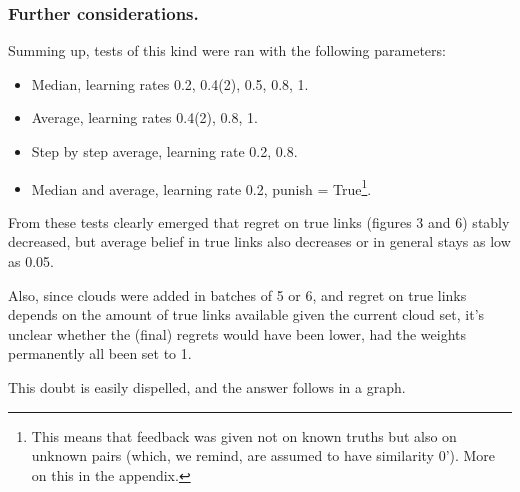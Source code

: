 \documentclass[11pt]{article}
\begin{document}
\subsubsection{Further considerations.}

Summing up, tests of this kind were ran with the following parameters:

\begin{itemize}
\item Median, learning rates 0.2, 0.4(2), 0.5, 0.8, 1.

\item Average, learning rates 0.4(2), 0.8, 1.

\item Step by step average, learning rate 0.2, 0.8.

\item Median and average, learning rate 0.2, punish = True\footnote{This means that feedback was given not on known truths but also on unknown pairs (which, we remind, are assumed to have similarity $0$'). More on this in the appendix.}.
\end{itemize}

From these tests clearly emerged that regret on true links (figures 3 and 6) stably decreased, but average belief in true links also decreases or in general stays as low as 0.05.

Also, since clouds were added in batches of 5 or 6, and regret on true links depends on the amount of true links available given the current cloud set, it's unclear whether the (final) regrets would have been lower, had the weights permanently all been set to 1.

This doubt is easily dispelled, and the answer follows in a graph. 
\end{document}
